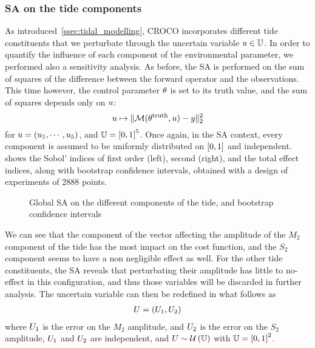 \documentclass[../../Main_ManuscritThese.tex]{subfiles}
\newcommand{\CROCO}{CROCO}
\newcommand\imgpath{/home/victor/acadwriting/Manuscrit/Text/Chapter5/img/}
\begin{document}
\subsubsection{SA on the tide components}
\label{ssec:SA_tide}
As introduced~\cref{ssec:tidal_modelling}, \CROCO{} incorporates
different tide constituents that we perturbate through the uncertain
variable $u\in\mathbb{U}$. In order to quantify the influence of each
component of the environmental parameter, we performed also a
sensitivity analysis. As before, the SA is performed on the sum of
squares of the difference between the forward operator and the
observations. This time however, the control parameter $\theta$ is set to its
truth value, and the sum of squares depends only on $u$:
\begin{equation}
  u \mapsto  \| \mathcal{M}(\theta^{\mathrm{truth}}, u) - y \|_2^2
\end{equation}
for $u = (u_1,\cdots,u_5)$, and $\Uspace = \interval{0}{1}^5$.
Once again, in the SA context, every component is assumed to be
uniformly distributed on $\interval{0}{1}$ and independent.
 shows the Sobol' indices of first order (left),
second (right), and the total effect indices, along with bootstrap
confidence intervals, obtained with a design of experiments of
\num{2888} points.
\begin{figure}[ht]
  \centering
  
  \caption[SA on the tide components]{\label{fig:SA_tides} Global SA
    on the different components of the tide, and bootstrap confidence
    intervals}
\end{figure}

We can see that the component of the vector affecting the amplitude of
the $M_2$ component of the tide has the most impact on the cost
function, and the $S_2$ component seems to have a non negligible
effect as well. For the other tide constituents, the SA reveals that
perturbating their amplitude has little to no-effect in this
configuration, and thus those variables will be discarded in further
analysis. The uncertain variable can then be redefined in what follows as
\begin{align}
  \UU = (\UU_1, \UU_2)%
\end{align}
where $U_1$ is the error on the $M_2$ amplitude, and $U_2$ is the
error on the $S_2$ amplitude, $U_1$ and $U_2$ are independent, and
$U \sim \mathcal{U}\left(\mathbb{U}\right)$ with
$\Uspace = \interval{0}{1}^2$.
\end{document}
